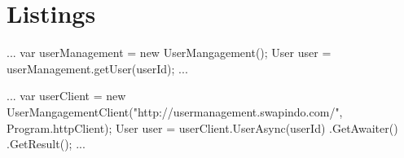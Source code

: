 \chapter{Listings}

\begin{CsCode}
	...
	var userManagement = new UserMangagement();
	User user = userManagement.getUser(userId);
	...
\end{CsCode}

\begin{CsCode}
	...
	var userClient = new UserMangagementClient("http://usermanagement.swapindo.com/", Program.httpClient);
	User user = userClient.UserAsync(userId)
		.GetAwaiter()
		.GetResult();
	...
\end{CsCode}
